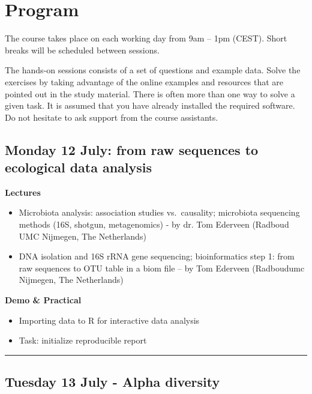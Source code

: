 \documentclass[
]{book}
\begin{document}
\hypertarget{program}{%
\chapter{Program}\label{program}}

The course takes place on each working day from 9am -- 1pm
(CEST). Short breaks will be scheduled between sessions.

The hands-on sessions consists of a set of questions and example
data. Solve the exercises by taking advantage of the online examples
and resources that are pointed out in the study material. There is
often more than one way to solve a given task. It is assumed that you
have already installed the required software. Do not hesitate to ask
support from the course assistants.

\hypertarget{monday-12-july-from-raw-sequences-to-ecological-data-analysis}{%
\section{Monday 12 July: from raw sequences to ecological data analysis}\label{monday-12-july-from-raw-sequences-to-ecological-data-analysis}}

\textbf{Lectures}

\begin{itemize}
\item
  Microbiota analysis: association studies vs.~causality; microbiota sequencing methods (16S, shotgun, metagenomics) - by dr. Tom Ederveen (Radboud UMC Nijmegen, The Netherlands)
\item
  DNA isolation and 16S rRNA gene sequencing; bioinformatics step 1: from raw sequences to OTU table in a biom file -- by Tom Ederveen (Radboudumc Nijmegen, The Netherlands)
\end{itemize}

\textbf{Demo \& Practical}

\begin{itemize}
\item
  Importing data to R for interactive data analysis
\item
  Task: initialize reproducible report
\end{itemize}

\begin{center}\rule{0.5\linewidth}{0.5pt}\end{center}

\hypertarget{tuesday-13-july---alpha-diversity}{%
\section{Tuesday 13 July - Alpha diversity}\label{tuesday-13-july---alpha-diversity}}
\end{document}

